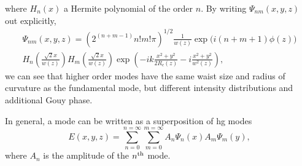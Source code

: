 where $H_n(x)$ a Hermite polynomial of the order $n$. By writing $\Psi_{nm}(x,y,z)$ out explicitly,
\begin{multline}
\Psi_{nm}(x,y,z) = \left(2^{(n+m-1)}n!m!\pi \right)^{1/2} \frac{1}{w(z)}\exp\big(i(n + m + 1)\phi(z)\big) \\ H_n\left(\frac{\sqrt{2}x}{w(z)}\right) H_m\left(\frac{\sqrt{2}x}{w(z)}\right) \exp\left(-ik\frac{x^2+y^2}{2R_c(z)} - i\frac{x^2 + y^2}{w^2(z)}\right),
\end{multline}
we can see that higher order modes have the same waist size and radius of curvature as the fundamental mode, but different intensity distributions and additional Gouy phase.
\par
In general, a mode can be written as a superposition of \gls{hg} modes 
\begin{equation}
E(x,y,z) = \sum_{n=0}^{n=\infty}\sum_{m=0}^{m=\infty}A_n \Psi_n(x)A_m \Psi_m(y),
\end{equation}
where $A_n$ is the amplitude of the $n^{\rm{th}}$ mode.